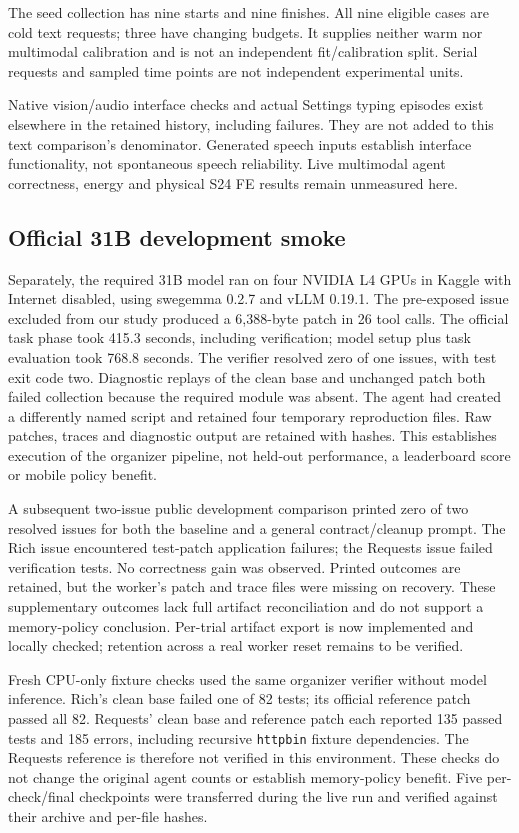 \documentclass[10pt,twocolumn]{article}
\begin{document}
The seed collection has nine starts and nine finishes. All nine eligible cases
are cold text requests; three have changing budgets. It supplies neither warm
nor multimodal calibration and is not an independent fit/calibration split.
Serial requests and sampled time points are not independent experimental units.

Native vision/audio interface checks and actual Settings typing episodes exist
elsewhere in the retained history, including failures. They are not added to this
text comparison's denominator. Generated speech inputs establish interface
functionality, not spontaneous speech reliability. Live multimodal agent
correctness, energy and physical S24 FE results remain unmeasured here.

\subsection{Official 31B development smoke}
Separately, the required 31B model ran on four NVIDIA L4 GPUs in Kaggle with
Internet disabled, using swegemma 0.2.7 and vLLM 0.19.1. The pre-exposed issue
excluded from our study produced a 6,388-byte patch in 26 tool calls. The official
task phase took 415.3 seconds, including verification; model setup plus task
evaluation took 768.8 seconds. The verifier resolved zero of one issues, with
test exit code two. Diagnostic replays of the clean base and unchanged patch
both failed collection because the required module was absent. The agent had
created a differently named script and retained four temporary reproduction
files. Raw patches, traces and diagnostic output are retained with hashes.
This establishes execution of the organizer pipeline, not held-out performance,
a leaderboard score or mobile policy benefit.

A subsequent two-issue public development comparison printed zero of two
resolved issues for both the baseline and a general contract/cleanup prompt.
The Rich issue encountered test-patch application failures; the Requests issue
failed verification tests. No correctness gain was observed. Printed outcomes
are retained, but the worker's patch and trace files were missing on recovery.
These supplementary outcomes lack full artifact reconciliation and do not
support a memory-policy conclusion. Per-trial artifact export is now implemented
and locally checked; retention across a real worker reset remains to be verified.

Fresh CPU-only fixture checks used the same organizer verifier without model
inference. Rich's clean base failed one of 82 tests; its official reference patch
passed all 82. Requests' clean base and reference patch each reported 135 passed
tests and 185 errors, including recursive \texttt{httpbin} fixture dependencies.
The Requests reference is therefore not verified in this environment. These
checks do not change the original agent counts or establish memory-policy
benefit. Five per-check/final checkpoints were transferred during the live run
and verified against their archive and per-file hashes.
\end{document}
